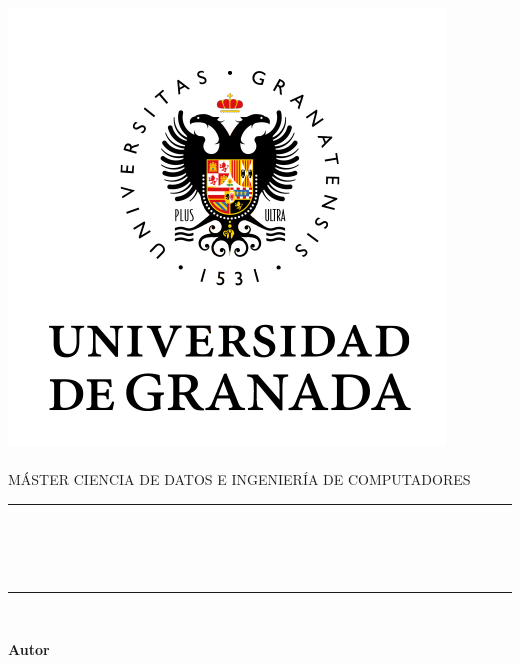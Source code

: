 \begin{titlepage}
    \begin{minipage}{\textwidth}
        \centering

        \includegraphics[scale=0.5]{img/ugr.png}\\

        \textsc{\Large \asignatura{}\\[0.2cm]}
        \textsc{MÁSTER CIENCIA DE DATOS E INGENIERÍA DE COMPUTADORES}\\[1cm]

        \noindent\rule[-1ex]{\textwidth}{1pt}\\[1.5ex]
        \textsc{{\Huge \titulo\\[0.5ex]}}
        \textsc{{\Large \subtitulo\\}}
        \noindent\rule[-1ex]{\textwidth}{2pt}\\[2.5ex]

        \end{minipage}

        \vspace{0.3cm}

        \begin{minipage}{\textwidth}

        \centering

        \textbf{Autor}\\ {\autor{}}\\[1.5ex]
        \vspace{0.4cm}


\end{minipage}
\end{titlepage}
